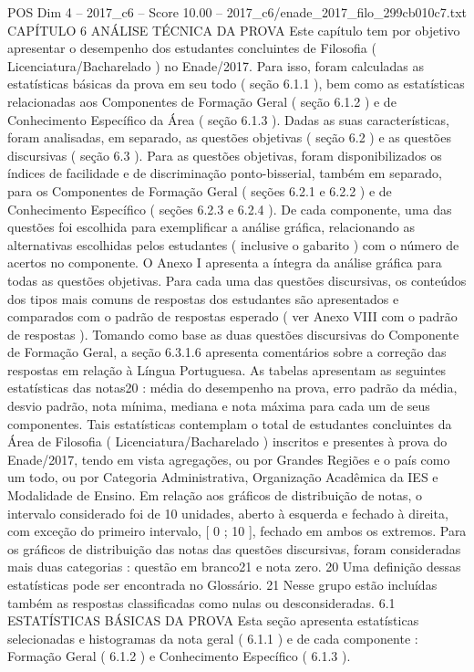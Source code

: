 \begin{textsample}{POS Dim 4 – 2017\_c6 – Score 10.00 – 2017\_c6/enade\_2017\_filo\_299cb010c7.txt}  \label{ex:f4_pos_037}
CAPÍTULO 6 ANÁLISE TÉCNICA DA PROVA Este capítulo tem por objetivo apresentar o desempenho dos estudantes concluintes de Filosofia ( Licenciatura/Bacharelado ) no Enade/2017.
Para isso, foram calculadas as estatísticas básicas da prova em seu todo ( seção 6.1.1 ), bem como as estatísticas relacionadas aos Componentes de Formação Geral ( seção 6.1.2 ) e de Conhecimento Específico da Área ( seção 6.1.3 ).
Dadas as suas características, foram analisadas, em separado, as questões objetivas ( seção 6.2 ) e as questões discursivas ( seção 6.3 ).
Para as questões objetivas, foram disponibilizados os índices de facilidade e de discriminação ponto-bisserial, também em separado, para os Componentes de Formação Geral ( seções 6.2.1 e 6.2.2 ) e de Conhecimento Específico ( seções 6.2.3 e 6.2.4 ).
De cada componente, uma das questões foi escolhida para exemplificar a análise gráfica, relacionando as alternativas escolhidas pelos estudantes ( inclusive o gabarito ) com o número de acertos no componente.
O Anexo I apresenta a íntegra da análise gráfica para todas as questões objetivas.
Para cada uma das questões discursivas, os conteúdos dos tipos mais comuns de respostas dos estudantes são apresentados e comparados com o padrão de respostas esperado ( ver Anexo VIII com o padrão de respostas ).
Tomando como base as duas questões discursivas do Componente de Formação Geral, a seção 6.3.1.6 apresenta comentários sobre a correção das respostas em relação à Língua Portuguesa.
As tabelas apresentam as seguintes estatísticas das notas20 : média do desempenho na prova, erro padrão da média, desvio padrão, nota mínima, mediana e nota máxima para cada um de seus componentes.
Tais estatísticas contemplam o total de estudantes concluintes da Área de Filosofia ( Licenciatura/Bacharelado ) inscritos e presentes à prova do Enade/2017, tendo em vista agregações, ou por Grandes Regiões e o país como um todo, ou por Categoria Administrativa, Organização Acadêmica da IES e Modalidade de Ensino.
Em relação aos gráficos de distribuição de notas, o intervalo considerado foi de 10 unidades, aberto à esquerda e fechado à direita, com exceção do primeiro intervalo, [ 0 ; 10 ], fechado em ambos os extremos.
Para os gráficos de distribuição das notas das questões discursivas, foram consideradas mais duas categorias : questão em branco21 e nota zero. 20 Uma definição dessas estatísticas pode ser encontrada no Glossário. 21 Nesse grupo estão incluídas também as respostas classificadas como nulas ou desconsideradas. 6.1 ESTATÍSTICAS BÁSICAS DA PROVA Esta seção apresenta estatísticas selecionadas e histogramas da nota geral ( 6.1.1 ) e de cada componente : Formação Geral ( 6.1.2 ) e Conhecimento Específico ( 6.1.3 ).

\end{textsample}
